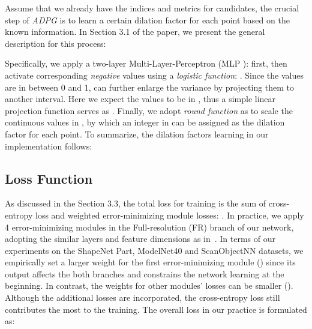 \documentclass[10pt,twocolumn,letterpaper]{article}
\begin{document}
Assume that we already have the indices  and metrics  for  candidates, the crucial step of \emph{ADPG} is to learn a certain dilation factor for each point based on the known information. In Section 3.1 of the paper, we present the general description for this process:


Specifically, we apply a two-layer Multi-Layer-Perceptron (MLP ):  first, then activate corresponding \emph{negative} values using a \emph{logistic function}: . Since the values are in between 0 and 1,  can further enlarge the variance by projecting them to another interval. Here we expect the values to be in , thus a simple linear projection function  serves as . Finally, we adopt \emph{round function} as  to scale the continuous values in , by which an integer in  can be assigned as the dilation factor for each point. To summarize, the dilation factors learning in our implementation follows:


\begin{table}
\begin{center}
\end{center}
\caption{Complexity of classification network on \emph{ModelNet40}. (running on GeForce GTX 2080Ti)}
\label{tab:complexity}
\end{table}
\subsection{Loss Function}
As discussed in the Section 3.3, the total loss for training is the sum of cross-entropy loss  and weighted error-minimizing module losses: . In practice, we apply 4 error-minimizing modules in the Full-resolution (FR) branch of our network, adopting the similar layers and feature dimensions as in~\cite{wang2019dynamic}. In terms of our experiments on the ShapeNet Part, ModelNet40 and ScanObjectNN datasets, we empirically set a larger weight for the first error-minimizing module () since its output affects the both branches and constrains the network learning at the beginning. In contrast, the weights for other modules' losses can be smaller (). Although the additional losses are incorporated, the cross-entropy loss still contributes the most to the training. The overall loss  in our practice is formulated as:
\end{document}
